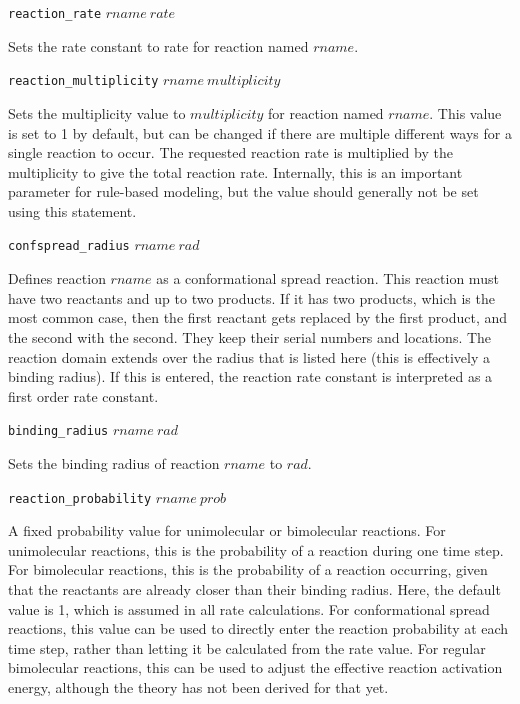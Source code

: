 \documentclass {book}
\newcommand {\ttt} {\texttt}
\begin{document}
\begin{description}
\item{\ttt{reaction\_rate} $rname\ rate$}

Sets the rate constant to rate for reaction named $rname$.

\item{\ttt{reaction\_multiplicity} $rname\ multiplicity$}

Sets the multiplicity value to $multiplicity$ for reaction named $rname$. This value is set to 1 by default, but can be changed if there are multiple different ways for a single reaction to occur. The requested reaction rate is multiplied by the multiplicity to give the total reaction rate. Internally, this is an important parameter for rule-based modeling, but the value should generally not be set using this statement.

\item{\ttt{confspread\_radius} $rname\ rad$}

Defines reaction $rname$ as a conformational spread reaction. This reaction must have two reactants and up to two products. If it has two products, which is the most common case, then the first reactant gets replaced by the first product, and the second with the second. They keep their serial numbers and locations. The reaction domain extends over the radius that is listed here (this is effectively a binding radius). If this is entered, the reaction rate constant is interpreted as a first order rate constant.

\item{\ttt{binding\_radius} $rname\ rad$}

Sets the binding radius of reaction $rname$ to $rad$.

\item{\ttt{reaction\_probability} $rname\ prob$}

A fixed probability value for unimolecular or bimolecular reactions. For unimolecular reactions, this is the probability of a reaction during one time step. For bimolecular reactions, this is the probability of a reaction occurring, given that the reactants are already closer than their binding radius. Here, the default value is 1, which is assumed in all rate calculations. For conformational spread reactions, this value can be used to directly enter the reaction probability at each time step, rather than letting it be calculated from the rate value. For regular bimolecular reactions, this can be used to adjust the effective reaction activation energy, although the theory has not been derived for that yet.


\end{description}
\end{document}
